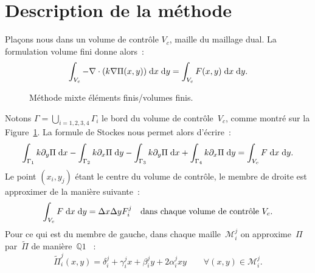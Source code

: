 \documentclass[main.tex]{subfiles}
\begin{document}
\section{Description de la méthode}
Plaçons nous dans un volume de contrôle $V_c$, maille du maillage dual.  La formulation volume fini donne alors~:
\begin{equation}
\int_{V_c} -\nabla\cdot ( k \nabla \Pi(x,y) ) \;{\rm d}x\;{\rm d}y = \int_{V_c}F(x,y) \;{\rm d}x\;{\rm d}y.
\end{equation}
\begin{figure}
\centering
\resizebox{.7\textwidth}{!}{}
\caption{\label{fig:methode_mixte_EFVF}Méthode mixte éléments finis/volumes finis.}
\end{figure}
Notons $\Gamma=\displaystyle \bigcup_{i=1,2,3,4} \Gamma_i$ le bord du volume de contrôle~$V_c$, comme montré sur la Figure~\ref{fig:methode_mixte_EFVF}. La formule de Stockes nous permet alors d'écrire~:
\begin{equation}
\int_{\Gamma_1}k \partial_y \Pi \;{\rm d}x - \int_{\Gamma_2}k \partial_x \Pi \;{\rm d}y - \int_{\Gamma_3}k \partial_y \Pi \;{\rm d}x + \int_{\Gamma_4}k \partial_x \Pi \;{\rm d}y = \int_{V_c}F \;{\rm d}x \;{\rm d}y.
\end{equation}
Le point $(x_i,y_j)$ étant le centre du volume de contrôle, le membre de droite est approximer de la manière suivante~:
\begin{equation}
\int_{V_c}F \;{\rm d}x \;{\rm d}y = \Delta x \Delta y F_i^j \quad \textrm{dans chaque volume de contrôle~} V_c.
\end{equation}
Pour ce qui est du membre de gauche, dans chaque maille~$\mathcal{M}_i^j$ on approxime~$\Pi$ par~$\tilde{\Pi}$ de manière~$\mathds{Q}1$ \ie~:
\begin{equation}\label{eq:anx_form_var_pr_eq_poisson}
\tilde{\Pi}_i^j(x,y) = \delta_i^j + \gamma_i^jx + \beta_i^jy + 2\alpha_i^jxy  \qquad \forall (x,y) \in \mathcal{M}_i^j.
\end{equation}
\end{document}
